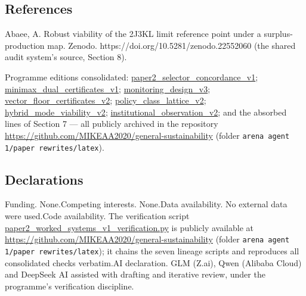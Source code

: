 \documentclass[10pt,twocolumn]{article}
\theoremstyle{definition}
\begin{document}
\subsection{References}\label{references}

Abaee, A. Robust viability of the 2J3KL limit reference point under a
surplus-production map. Zenodo. https://doi.org/10.5281/zenodo.22552060
(the shared audit system's source, Section 8).

\sloppy
Programme editions consolidated: \url{paper2_selector_concordance_v1};
\url{minimax_dual_certificates_v1}; \url{monitoring_design_v3};
\url{vector_floor_certificates_v2};
\url{policy_class_lattice_v2}; \url{hybrid_mode_viability_v2};
\url{institutional_observation_v2}; and the absorbed lines of Section 7
--- all publicly archived in the repository
\url{https://github.com/MIKEAA2020/general-sustainability}
(folder \texttt{arena agent 1/paper rewrites/latex}).

\subsection{Declarations}\label{declarations}

\sloppy
Funding. None.\quad Competing interests. None.\quad Data availability. No
external data were used.\quad Code availability. The verification script
\url{paper2_worked_systems_v1_verification.py} is publicly available
at \url{https://github.com/MIKEAA2020/general-sustainability} (folder
\texttt{arena agent 1/paper rewrites/latex}); it chains the seven lineage
scripts and reproduces all consolidated checks verbatim.\quad AI declaration.
GLM (Z.ai), Qwen (Alibaba Cloud) and DeepSeek AI assisted with drafting and
iterative review, under the programme's verification discipline.
\end{document}
